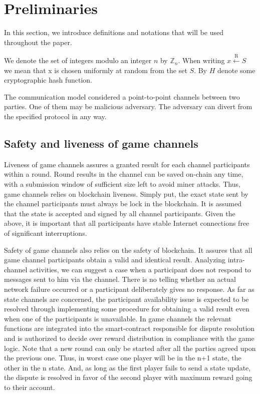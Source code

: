 \section{Preliminaries}
In this section, we introduce definitions and notations that will be used throughout the paper.

We denote the set of integers modulo an integer $n$ by $\mathbb{Z}_n$. When writing $x \xleftarrow{\text{R}} S$ we mean that x is chosen uniformly at random from the set $S$. By $H$ denote some cryptographic hash function. 

The communication model considered a point-to-point channels between two parties. One of them may be malicious adversary. The adversary can divert from the specified protocol in any way. 

	\subsection{Safety and liveness of game channels}

Liveness of game channels assures a granted result for each channel participants within a round. Round results in the channel can be saved on-chain any time,  with a submission window of sufficient size left to avoid miner attacks. Thus, game channels relies on blockchain liveness. Simply put,  the exact state sent by the channel participants must always be lock in the blockchain. It is assumed that the state is accepted and signed by all channel participants. Given the above, it is important that all participants have stable Internet connections free of significant interruptions. 

Safety of game channels also relies on the safety of blockchain. It assures that all game channel participants obtain a valid and identical result. Analyzing intra-channel activities, we can suggest a case when a participant does not respond to messages sent to him via the channel. There is no telling whether an actual network failure occurred or a participant deliberately gives no response. As far as state channels are concerned, the participant availability issue is expected to be resolved through implementing some procedure for obtaining a valid result even when one of the participants is unavailable. In game channels the relevant functions are integrated into the smart-contract responsible for dispute resolution and is authorized to decide over reward distribution in compliance with the game logic. Note that a new round can only be started after all the parties agreed upon the previous one. Thus, in worst case one player will be in the n+1 state, the other in the n state. And, as long as the first player fails to send a state update, the dispute is resolved in favor of the second player with maximum reward going to their account.

